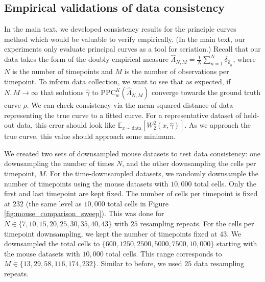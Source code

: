 \documentclass[aos, preprint]{imsart}
\theoremstyle{plain}
\theoremstyle{remark}
\begin{document}
\begin{appendix}
\subsection*{Empirical validations of data consistency}
 In the main text, we developed consistency results for the principle curves method which would be valuable to verify empirically. (In the main text, our experiments only evaluate principal curves as a tool for seriation.) Recall that our data takes the form of the doubly empirical measure $\hat{\Lambda}_{N, M} = \frac{1}{N} \sum_{n=1}^N \delta_{\hat{\rho}_{n}}$, where $N$ is the number of timepoints and $M$ is the number of observations per timepoint. To inform data collection, we want to see that as expected, if $N, M \to \infty$ that solutions $\hat{\gamma}$ to $\text{PPC}^K_w(\hat{\Lambda}_{N, M})$ converge towards the ground truth curve $\rho$. We can check consistency via the mean squared distance of data representing the true curve to a fitted curve. For a representative dataset of held-out data, this error should look like $\mathbb{E}_{x\sim\textrm{data}} [W_2^2(x, \hat{\gamma})]$. As we approach the true curve, this value should approach some minimum.

We created two sets of downsampled mouse datasets to test data consistency: one downsampling the number of times $N$, and the other downsampling the cells per timepoint, $M$. For the time-downsampled datasets, we randomly downsample the number of timepoints using the mouse datasets with $10{,}000$ total cells. Only the first and last timepoint are kept fixed. The number of cells per timepoint is fixed at $232$ (the same level as $10{,}000$ total cells in Figure \ref{fig:mouse_comparison_sweep}). This was done for $N \in \{7, 10, 15, 20, 25, 30, 35, 40, 43\}$ with $25$ resampling repeats. For the cells per timepoint downsampling, we kept the number of timepoints fixed at $43$. We downsampled the total cells to $\{600, 1250, 2500, 5000, 7500, 10{,}000\}$ starting with the mouse datasets with $10{,}000$ total cells. This range corresponds to $M \in \{13, 29, 58, 116, 174, 232\}$. Similar to before, we used $25$ data resampling repeats.


\end{appendix}
\end{document}
